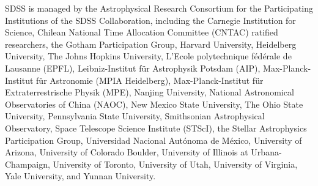 \documentclass[modern]{aastex631}
\begin{document}
SDSS is managed by the Astrophysical Research Consortium for the Participating Institutions of the SDSS Collaboration, including the Carnegie Institution for Science, Chilean National Time Allocation Committee (CNTAC) ratified researchers, the Gotham Participation Group, Harvard University, Heidelberg University, The Johns Hopkins University, L’Ecole polytechnique f\'{e}d\'{e}rale de Lausanne (EPFL), Leibniz-Institut f{\"u}r Astrophysik Potsdam (AIP), Max-Planck-Institut f{\"u}r Astronomie (MPIA Heidelberg), Max-Planck-Institut f{\"u}r Extraterrestrische Physik (MPE), Nanjing University, National Astronomical Observatories of China (NAOC), New Mexico State University, The Ohio State University, Pennsylvania State University, Smithsonian Astrophysical Observatory, Space Telescope Science Institute (STScI), the Stellar Astrophysics Participation Group, Universidad Nacional Aut\'{o}noma de M\'{e}xico, University of Arizona, University of Colorado Boulder, University of Illinois at Urbana-Champaign, University of Toronto, University of Utah, University of Virginia, Yale University, and Yunnan University.




{}

\end{document}
